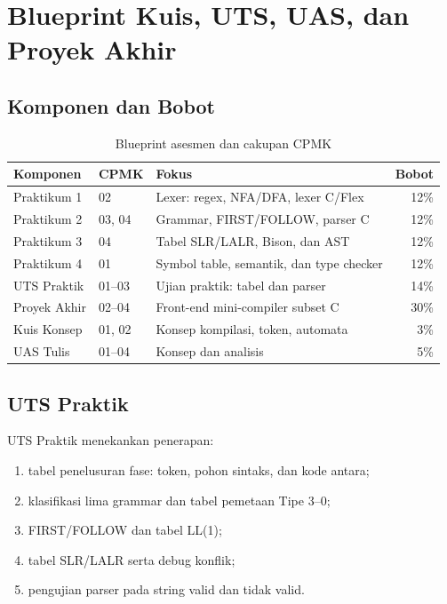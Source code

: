 \section{Blueprint Kuis, UTS, UAS, dan Proyek Akhir}
\label{sec:ch17-blueprint}

\subsection{Komponen dan Bobot}

\begin{table}[H]
\centering
\caption{Blueprint asesmen dan cakupan CPMK}
\label{tab:ch17-blueprint}
\begin{tabularx}{\textwidth}{@{}l l X r@{}}
\toprule
\textbf{Komponen} & \textbf{CPMK} & \textbf{Fokus} & \textbf{Bobot} \\
\midrule
Praktikum 1 & 02 & Lexer: regex, NFA/DFA, lexer C/Flex & 12\% \\
Praktikum 2 & 03, 04 & Grammar, FIRST/FOLLOW, parser C & 12\% \\
Praktikum 3 & 04 & Tabel SLR/LALR, Bison, dan AST & 12\% \\
Praktikum 4 & 01 & Symbol table, semantik, dan type checker & 12\% \\
UTS Praktik & 01--03 & Ujian praktik: tabel dan parser & 14\% \\
Proyek Akhir & 02--04 & Front-end mini-compiler subset C & 30\% \\
Kuis Konsep & 01, 02 & Konsep kompilasi, token, automata & 3\% \\
UAS Tulis & 01--04 & Konsep dan analisis & 5\% \\
\bottomrule
\end{tabularx}
\end{table}

\subsection{UTS Praktik}

UTS Praktik menekankan penerapan:
\begin{enumerate}[label=\arabic*.,leftmargin=*]
  \item tabel penelusuran fase: token, pohon sintaks, dan kode antara;
  \item klasifikasi lima grammar dan tabel pemetaan Tipe 3--0;
  \item FIRST/FOLLOW dan tabel LL(1);
  \item tabel SLR/LALR serta debug konflik;
  \item pengujian parser pada string valid dan tidak valid.
\end{enumerate}

